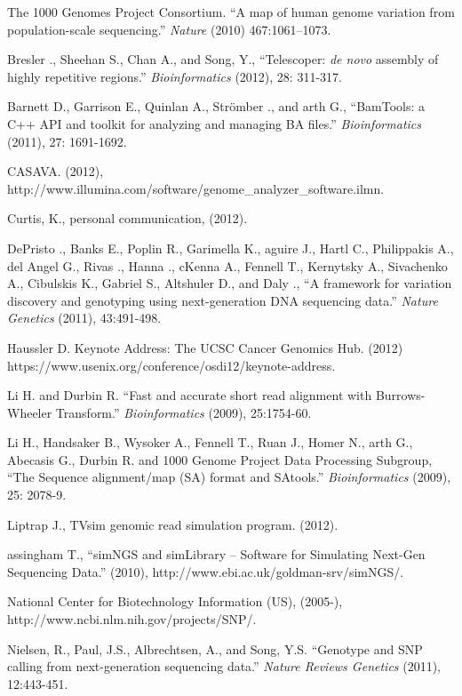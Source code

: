 \documentclass[10pt]{article}
\begin{document}
\begin{thebibliography}{1}

 The 1000 Genomes Project Consortium. ``A map of human genome variation from population-scale sequencing.'' {\em Nature} (2010) 467:1061–1073.

 Bresler ., Sheehan S., Chan A., and Song, Y., ``Telescoper: {\it de novo} assembly of highly repetitive regions.'' {\em Bioinformatics} (2012), 28: 311-317.

 Barnett D., Garrison E., Quinlan A., Str\"{o}mber ., and arth G., ``BamTools: a C++ API and toolkit for analyzing and managing BA files.'' {\em Bioinformatics} (2011), 27: 1691-1692.

 CASAVA. (2012), http://www.illumina.com/software/genome\_analyzer\_software.ilmn.

 Curtis, K., personal communication, (2012).

 DePristo ., Banks E., Poplin R., Garimella K., aguire J., Hartl C., Philippakis A., del Angel G., Rivas ., Hanna ., cKenna A., Fennell T., Kernytsky A., Sivachenko A., Cibulskis K., Gabriel S., Altshuler D., and Daly ., ``A framework for variation discovery and genotyping using next-generation DNA sequencing data.'' {\em Nature Genetics} (2011), 43:491-498.

 Haussler D. Keynote Address: The UCSC Cancer Genomics Hub. (2012) https://www.usenix.org/conference/osdi12/keynote-address.

 Li H. and Durbin R. ``Fast and accurate short read alignment with Burrows-Wheeler Transform.'' {\em Bioinformatics} (2009), 25:1754-60.

 Li H., Handsaker B., Wysoker A., Fennell T., Ruan J., Homer N., arth G., Abecasis G., Durbin R. and 1000 Genome Project Data Processing Subgroup, ``The Sequence alignment/map (SA) format and SAtools.'' {\em Bioinformatics} (2009), 25: 2078-9.

 Liptrap J., TVsim genomic read simulation program. (2012).

 assingham T., ``simNGS and simLibrary -- Software for Simulating Next-Gen Sequencing Data.'' (2010), http://www.ebi.ac.uk/goldman-srv/simNGS/.

 National Center for Biotechnology Information (US), (2005-), http://www.ncbi.nlm.nih.gov/projects/SNP/.

 Nielsen, R., Paul, J.S., Albrechtsen, A., and Song, Y.S. ``Genotype and SNP calling from next-generation sequencing data.'' {\em Nature Reviews Genetics} (2011), 12:443-451. 


\end{thebibliography}
\end{document}
